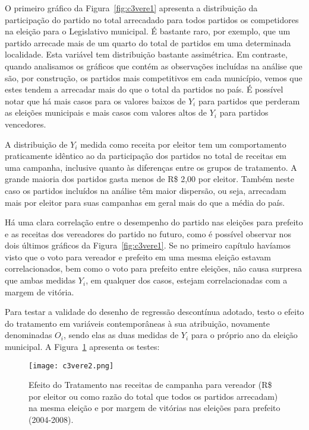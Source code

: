 O primeiro gráfico da Figura~\ref{fig:c3vere1} apresenta a distribuição da participação do partido no total arrecadado para todos partidos os competidores na eleição para o Legislativo municipal. É bastante raro, por exemplo, que um partido arrecade mais de um quarto do total de partidos em uma determinada localidade. Esta variável tem distribuição bastante assimétrica. Em contraste, quando analisamos os gráficos que contém as observações incluídas na análise que são, por construção, os partidos mais competitivos em cada município, vemos que estes tendem a arrecadar mais do que o total da partidos no país. É possível notar que há mais casos para os valores baixos de $Y_{i}$ para partidos que perderam as eleições municipais e mais casos com valores altos de $Y_{i}$ para partidos vencedores.

A distribuição de $Y_{i}$ medida como receita por eleitor tem um comportamento praticamente idêntico ao da participação dos partidos no total de receitas em uma campanha, inclusive quanto às diferenças entre os grupos de tratamento. A grande maioria dos partidos gasta menos de R\$ 2,00 por eleitor. Também neste caso os partidos incluídos na análise têm maior dispersão, ou seja, arrecadam mais por eleitor para suas campanhas em geral mais do que a média do país.

Há uma clara correlação entre o desempenho do partido nas eleições para prefeito e as receitas dos vereadores do partido no futuro, como é possível observar nos dois últimos gráficos da Figura~\ref{fig:c3vere1}. Se no primeiro capítulo havíamos visto que o voto para vereador e prefeito em uma mesma eleição estavam correlacionados, bem como o voto para prefeito entre eleições, não causa surpresa que ambas medidas $Y_{i}$, em qualquer dos casos, estejam correlacionadas com a margem de vitória.

Para testar a validade do desenho de regressão descontínua adotado, testo o efeito do tratamento em variáveis contemporâneas à sua atribuição, novamente denominadas $O_{i}$, sendo elas as duas medidas de $Y_{i}$ para o próprio ano da eleição municipal. A Figura~\ref{fig:c3vere2} apresenta os testes:

\begin{figure}[htp]
	\centering
	\texttt{[image: c3vere2.png]}
	\caption{Efeito do Tratamento nas receitas de campanha para vereador (R\$ por eleitor ou como razão do total que todos os partidos arrecadam) na mesma eleição e por margem de vitórias nas eleições para prefeito (2004-2008).}
	\label{fig:c3vere2}
\end{figure}

